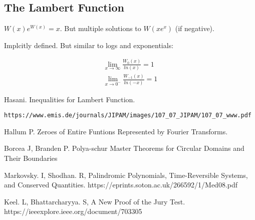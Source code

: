 \documentclass[10pt]{article}
\newcommand{\1}{\textbf{1}}
\theoremstyle{remark}
\theoremstyle{definition}
\theoremstyle{prop}
\theoremstyle{Corollary}
\begin{document}
\subsection{The Lambert Function}

$W(x)e^{W(x)} = x$. But multiple solutions to $W(xe^x)$ (if negative).

Implcitly defined. But similar to logs and exponentials:

\begin{align*}
	\lim_{x \to \infty} \frac{W_0(x)}{ln(x)} = 1\\
	\lim_{x \to 0^-} \frac{W_{-1}(x)}{ln(-x)} = 1
\end{align*}



\begin{thebibliography}{9}

 Hasani. Inequalities for Lambert Function. \begin{verbatim}https://www.emis.de/journals/JIPAM/images/107_07_JIPAM/107_07_www.pdf \end{verbatim}

 Hallum P. Zeroes of Entire Funtions Represented by Fourier Transforms. 

 Borcea J, Branden P. Polya-schur Master Theorems for Circular Domains and Their Boundaries


 Markovsky. I, Shodhan. R,
Palindromic Polynomials, Time-Reversible Systems, and Conserved Quantities. https://eprints.soton.ac.uk/266592/1/Med08.pdf

 Keel. L, Bhattarcharyya. S,
A New Proof of the Jury Test. https://ieeexplore.ieee.org/document/703305



\end{thebibliography}
\end{document}
